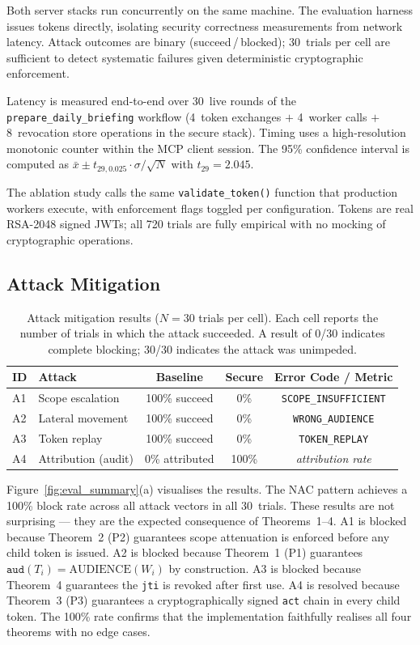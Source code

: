\documentclass[journal]{IEEEtran}
\begin{document}
Both server stacks run concurrently on the same machine. The evaluation harness
issues tokens directly, isolating security correctness measurements from network
latency. Attack outcomes are binary (succeed\,/\,blocked); 30~trials per cell
are sufficient to detect systematic failures given deterministic cryptographic
enforcement.

Latency is measured end-to-end over 30~live rounds of the
\texttt{prepare\_daily\_briefing} workflow (4~token exchanges $+$ 4~worker
calls $+$ 8~revocation store operations in the secure stack). Timing uses a
high-resolution monotonic counter within the MCP client session. The 95\%
confidence interval is computed as
$\bar{x} \pm t_{29,0.025} \cdot \sigma/\sqrt{N}$ with $t_{29} = 2.045$.

The ablation study calls the same \texttt{validate\_token()} function that
production workers execute, with enforcement flags toggled per configuration.
Tokens are real RSA-2048 signed JWTs; all 720 trials are fully empirical with
no mocking of cryptographic operations.

\subsection{Attack Mitigation}

\begin{table}[h]
\caption{Attack mitigation results ($N=30$ trials per cell). Each cell reports
the number of trials in which the attack succeeded. A result of 0/30 indicates
complete blocking; 30/30 indicates the attack was unimpeded.}
\label{tab:attacks}
\centering
\footnotesize
\setlength{\tabcolsep}{4pt}
\begin{tabular}{llccc}
\toprule
\textbf{ID} & \textbf{Attack} & \textbf{Baseline} & \textbf{Secure} & \textbf{Error Code / Metric} \\
\midrule
A1 & Scope escalation    & 100\% succeed & 0\%  & \texttt{SCOPE\_INSUFFICIENT} \\
A2 & Lateral movement    & 100\% succeed & 0\%  & \texttt{WRONG\_AUDIENCE} \\
A3 & Token replay        & 100\% succeed & 0\%  & \texttt{TOKEN\_REPLAY} \\
A4 & Attribution (audit) & 0\% attributed & 100\% & \textit{attribution rate} \\
\bottomrule
\end{tabular}
\end{table}

Figure~\ref{fig:eval_summary}(a) visualises the results.
The NAC pattern achieves a 100\% block rate across all attack vectors in all
30~trials. These results are not surprising --- they are the expected
consequence of Theorems~1--4. A1 is blocked because Theorem~2 (P2) guarantees
scope attenuation is enforced before any child token is issued. A2 is blocked
because Theorem~1 (P1) guarantees $\texttt{aud}(T_i) = \mathrm{AUDIENCE}(W_i)$
by construction. A3 is blocked because Theorem~4 guarantees the \texttt{jti}
is revoked after first use. A4 is resolved because Theorem~3 (P3) guarantees
a cryptographically signed \texttt{act} chain in every child token. The
100\% rate confirms that the implementation faithfully realises all four
theorems with no edge cases.
\end{document}
